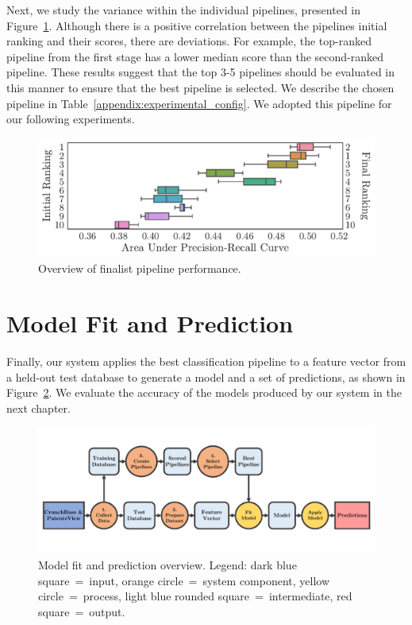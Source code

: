 \documentclass[../thesis/thesis.tex]{subfiles}
\begin{document}
Next, we study the variance within the individual pipelines, presented in Figure~\ref{fig:design:selection_agg_rank}. Although there is a positive correlation between the pipelines initial ranking and their scores, there are deviations. For example, the top-ranked pipeline from the first stage has a lower median score than the second-ranked pipeline. These results suggest that the top 3-5 pipelines should be evaluated in this manner to ensure that the best pipeline is selected. We describe the chosen pipeline in Table~\ref{appendix:experimental_config}. We adopted this pipeline for our following experiments.

\begin{figure}[!htb]
    \centering
    \includegraphics[width=\textwidth]{../figures/design/auc_finalists_rank}
    \caption[Overview of finalist pipeline performance]{Overview of finalist pipeline performance.}
    \label{fig:design:selection_agg_rank}
\end{figure}

\section{Model Fit and Prediction}

Finally, our system applies the best classification pipeline to a feature vector from a held-out test database to generate a model and a set of predictions, as shown in Figure~\ref{fig:design:make_predictions}. We evaluate the accuracy of the models produced by our system in the next chapter.

\begin{figure}[!htb]
    \centering
    \includegraphics[width=\textwidth]{../figures/design/flowchart_make_predictions}
    \caption[Model fit and prediction flowchart]{Model fit and prediction overview. Legend: dark blue square~=~input, orange circle~=~system component, yellow circle~=~process, light blue rounded square~=~intermediate, red square~=~output.}
    \label{fig:design:make_predictions}
\end{figure}

\end{document}
